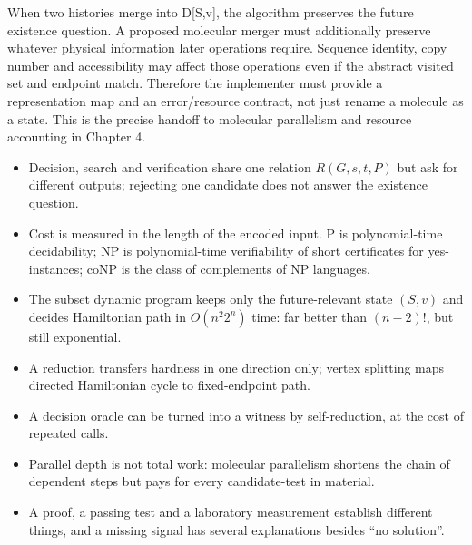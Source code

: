 
When two histories merge into D{[}S,v{]}, the algorithm preserves the
future existence question. A proposed molecular merger must additionally
preserve whatever physical information later operations require.
Sequence identity, copy number and accessibility may affect those
operations even if the abstract visited set and endpoint match.
Therefore the implementer must provide a representation map and an
error/resource contract, not just rename a molecule as a state. This is
the precise handoff to molecular parallelism and resource accounting in
Chapter 4.

\begin{KeyIdeas}
\begin{itemize}\setlength{\itemsep}{2pt}
\item Decision, search and verification share one relation $R(G,s,t,P)$ but ask
for different outputs; rejecting one candidate does not answer the existence
question.
\item Cost is measured in the length of the encoded input. P is polynomial-time
decidability; NP is polynomial-time verifiability of short certificates for
yes-instances; coNP is the class of complements of NP languages.
\item The subset dynamic program keeps only the future-relevant state
$(S,v)$ and decides Hamiltonian path in $O(n^2 2^n)$ time: far better than
$(n-2)!$, but still exponential.
\item A reduction transfers hardness in one direction only; vertex splitting maps
directed Hamiltonian cycle to fixed-endpoint path.
\item A decision oracle can be turned into a witness by self-reduction, at the
cost of repeated calls.
\item Parallel depth is not total work: molecular parallelism shortens the
chain of dependent steps but pays for every candidate-test in material.
\item A proof, a passing test and a laboratory measurement establish different
things, and a missing signal has several explanations besides ``no solution''.
\end{itemize}
\end{KeyIdeas}

